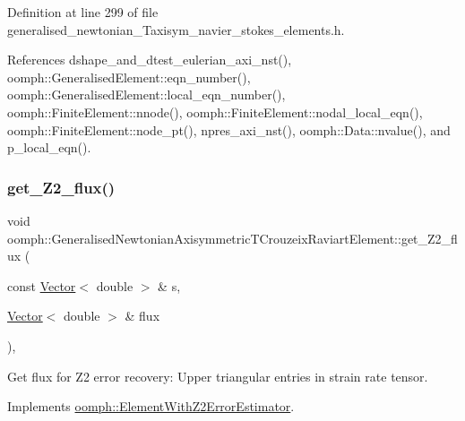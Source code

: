 Definition at line 299 of file generalised\+\_\+newtonian\+\_\+\+Taxisym\+\_\+navier\+\_\+stokes\+\_\+elements.\+h.



References dshape\+\_\+and\+\_\+dtest\+\_\+eulerian\+\_\+axi\+\_\+nst(), oomph\+::\+Generalised\+Element\+::eqn\+\_\+number(), oomph\+::\+Generalised\+Element\+::local\+\_\+eqn\+\_\+number(), oomph\+::\+Finite\+Element\+::nnode(), oomph\+::\+Finite\+Element\+::nodal\+\_\+local\+\_\+eqn(), oomph\+::\+Finite\+Element\+::node\+\_\+pt(), npres\+\_\+axi\+\_\+nst(), oomph\+::\+Data\+::nvalue(), and p\+\_\+local\+\_\+eqn().

\mbox{\label{classoomph_1_1GeneralisedNewtonianAxisymmetricTCrouzeixRaviartElement_a8440a0c7aab6c6f4095d06b0063842ca}} 
\subsubsection{\texorpdfstring{get\+\_\+\+Z2\+\_\+flux()}{get\_Z2\_flux()}}
{\footnotesize\ttfamily void oomph\+::\+Generalised\+Newtonian\+Axisymmetric\+T\+Crouzeix\+Raviart\+Element\+::get\+\_\+\+Z2\+\_\+flux (\begin{DoxyParamCaption}\item[{const \hyperlink{classoomph_1_1Vector}{Vector}$<$ double $>$ \&}]{s,  }\item[{\hyperlink{classoomph_1_1Vector}{Vector}$<$ double $>$ \&}]{flux }\end{DoxyParamCaption})\hspace{0.3cm}{\ttfamily [inline]}, {\ttfamily [virtual]}}



Get \textquotesingle{}flux\textquotesingle{} for Z2 error recovery\+: Upper triangular entries in strain rate tensor. 



Implements \hyperlink{classoomph_1_1ElementWithZ2ErrorEstimator_a5688ff5f546d81771cabad82ca5a7556}{oomph\+::\+Element\+With\+Z2\+Error\+Estimator}.



